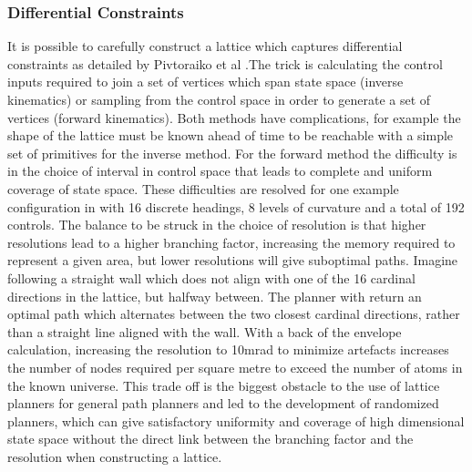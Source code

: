\subsubsection{Differential Constraints}
It is possible to carefully construct a lattice which captures differential constraints as detailed by Pivtoraiko et al \cite{Pivtoraiko2009}.The trick is calculating the control inputs required to join a set of vertices which span state space (inverse kinematics) or sampling from the control space in order to generate a set of vertices (forward kinematics). Both methods have complications, for example the shape of the lattice must be known ahead of time to be reachable with a simple set of primitives for the inverse method. For the forward method the difficulty is in the choice of interval in control space that leads to complete and uniform coverage of state space. These difficulties are resolved for one example configuration in \cite{Pivtoraiko2009} with 16 discrete headings, 8 levels of curvature and a total of 192 controls. The balance to be struck in the choice of resolution is that higher resolutions lead to a higher branching factor, increasing the memory required to represent a given area, but lower resolutions will give suboptimal paths. Imagine following a straight wall which does not align with one of the 16 cardinal directions in the lattice, but halfway between. The planner with return an optimal path which alternates between the two closest cardinal directions, rather than a straight line aligned with the wall. With a back of the envelope calculation, increasing the resolution to 10mrad to minimize artefacts increases the number of nodes required per square metre to exceed the number of atoms in the known universe. This trade off is the biggest obstacle to the use of lattice planners for general path planners and led to the development of randomized planners, which can give satisfactory uniformity and coverage of high dimensional state space without the direct link between the branching factor and the resolution when constructing a lattice.   

